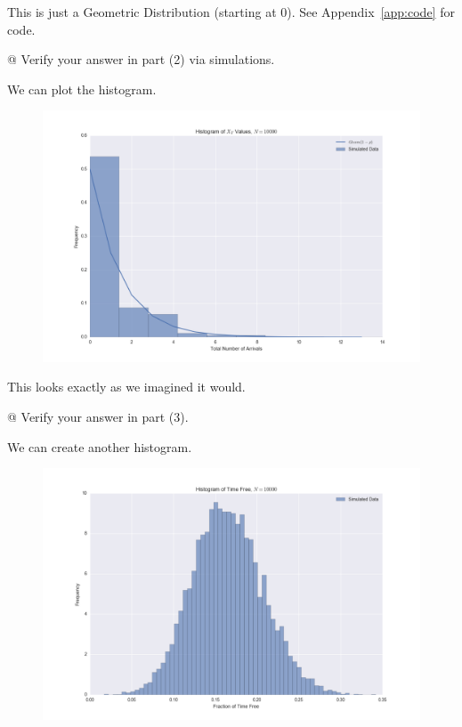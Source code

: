 \documentclass[10pt]{article}
\begin{document}
\begin{easylist}[enumerate]
    This is just a Geometric Distribution (starting at 0). See
    Appendix~\ref{app:code} for code.

    \vspace{0.5cm}
    @ Verify your answer in part (2) via simulations.
    \vspace{0.5cm}

    We can plot the histogram.

    \begin{figure}[H]
        \centering
        \includegraphics[scale=0.3]{./xt_dist.png}
    \end{figure}

    This looks exactly as we imagined it would.

    \vspace{0.5cm}
    @ Verify your answer in part (3).
    \vspace{0.5cm}

    We can create another histogram.

    \begin{figure}[H]
        \centering
        \includegraphics[scale=0.3]{./time_free.png}
    \end{figure}


\end{easylist}
\end{document}
